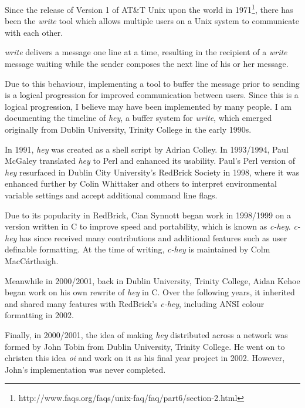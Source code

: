 Since the release of Version 1 of AT\&T Unix upon the world 
in 1971\footnote{http://www.faqs.org/faqs/unix-faq/faq/part6/section-2.html}, 
there has been the \emph{write} tool which allows multiple users on a Unix 
system to communicate with each other.


\emph{write} delivers a message one line at a time,
resulting in the recipient of a \emph{write} message waiting while the
sender composes the next line of his or her message.


Due to this behaviour, implementing a tool to buffer the message
prior to sending is a logical progression for improved communication
between users. Since this is a logical progression, I believe 
may have been implemented by many people. I am documenting the 
timeline of \emph{hey}, a buffer system for \emph{write}, which emerged 
originally from Dublin University, Trinity College in the early 1990s.


In 1991, \emph{hey} was created as a shell script by Adrian Colley. In 
1993/1994, Paul McGaley translated \emph{hey} to Perl and enhanced its 
usability. Paul's Perl version of \emph{hey} resurfaced in Dublin City 
University's RedBrick Society in 1998, where it was enhanced further by
Colin Whittaker and others to interpret environmental variable settings 
and accept additional command line flags.


Due to its popularity in RedBrick, Cian Synnott began work in 1998/1999
on a version written in C to improve speed and portability, which is 
known as \emph{c-hey}. \emph{c-hey} has since received many 
contributions and additional features such as user definable formatting.
At the time of writing, \emph{c-hey} is maintained by Colm 
MacC\'{a}rthaigh.


Meanwhile in 2000/2001, back in Dublin University, Trinity College, Aidan 
Kehoe began work on his own rewrite of \emph{hey} in C. Over the 
following years, it inherited and shared many features with RedBrick's 
\emph{c-hey}, including ANSI colour formatting in 2002.


Finally, in 2000/2001, the idea of making \emph{hey} distributed across 
a network was formed by John Tobin from Dublin University, Trinity 
College.  He went on to christen this idea \emph{oi} and work on it 
as his final year project in 2002. However, John's implementation was
never completed.
